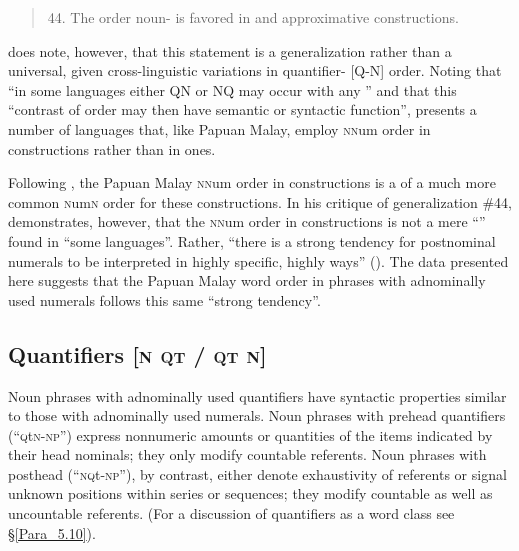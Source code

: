 \begin{quote}
44. The order noun- is favored in  and approximative constructions.
\end{quote}


\citet[284]{Greenberg.1978b} does note, however, that this statement is a generalization rather than a universal, given cross-linguistic variations in quantifier- [Q-N] order. Noting that “in some languages either QN or NQ may occur with any ” and that this “contrast of order may then have semantic or syntactic function”, \citet[284]{Greenberg.1978b} presents a number of languages that, like Papuan Malay, employ \textsc{nn}um order in  constructions rather than in  ones.



Following \citet[284]{Greenberg.1978b}, the Papuan Malay \textsc{nn}um order in  constructions is a  of a much more common \textsc{n}um\textsc{n} order for these constructions. In his critique of   generalization \#44, \citet{Donohue.2005} demonstrates, however, that the \textsc{nn}um order in  constructions is not a mere “” found in “some languages”. Rather, “there is a strong tendency for postnominal numerals to be interpreted in highly specific, highly  ways” (\citeyear*[34]{Donohue.2005}). The data presented here suggests that the Papuan Malay word order in  phrases with adnominally used numerals follows this same “strong tendency”.


\subsection{Quantifiers [\textsc{n} \textsc{qt} / \textsc{qt} \textsc{n}]}
\label{Para_8.3.2}
Noun phrases with adnominally used quantifiers have syntactic properties similar to those with adnominally used numerals. Noun phrases with prehead quantifiers (``\textsc{q}t\textsc{n-np}'') express nonnumeric amounts or quantities of the items indicated by their head nominals; they only modify countable referents. Noun phrases with posthead  (``\textsc{nq}t\textsc{{}-np}''), by contrast, either denote exhaustivity of  referents or signal unknown positions within series or sequences; they modify countable as well as uncountable referents. (For a discussion of quantifiers as a word class see §\ref{Para_5.10}).




